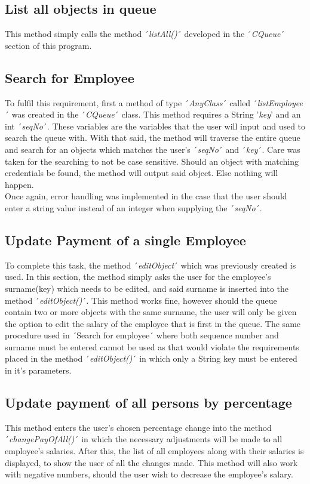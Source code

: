 \documentclass[12pt]{article}
\begin{document}
\subsection{List all objects in queue}
This method simply calls the method ´\emph{listAll()}´ developed in the ´\emph{CQueue}´ section of this program.

\subsection{Search for Employee}
To fulfil this requirement, first a method of type ´\emph{AnyClass}´ called ´\emph{listEmployee}´ was created in the ´\emph{CQueue}´ class. This method requires a String '\emph{key}' and an int ´\emph{seqNo}´. These variables are the variables that the user will input and used to search the queue with. With that said, the method will traverse the entire queue and search for an objects which matches the user's ´\emph{seqNo}´ and ´\emph{key}´. Care was taken for the searching to not be case sensitive. Should an object with matching credentials be found, the method will output said object. Else nothing will happen.
\bigskip
\\Once again, error handling was implemented in the case that the user should enter a string value instead of an integer when supplying the ´\emph{seqNo}´.

\subsection{Update Payment of a single Employee}
To complete this task, the method ´\emph{editObject}´ which was previously created is used. In this section, the method simply asks the user for the employee's surname(key) which needs to be edited, and said surname is inserted into the method ´\emph{editObject()}´. This method works fine, however should the queue contain two or more objects with the same surname, the user will only be given the option to edit the salary of the employee that is first in the queue. The same procedure used in ´Search for employee´ where both sequence number and surname must be entered cannot be used as that would violate the requirements placed in the method ´\emph{editObject()}´ in which only a String key must be entered in it's parameters.

\subsection{Update payment of all persons by percentage}
This method enters the user's chosen percentage change into the method ´\emph{changePayOfAll()}´ in which the necessary adjustments will be made to all employee's salaries. After this, the list of all employees along with their salaries is displayed, to show the user of all the changes made. This method will also work with negative numbers, should the user wish to decrease the employee's salary.
\end{document}
